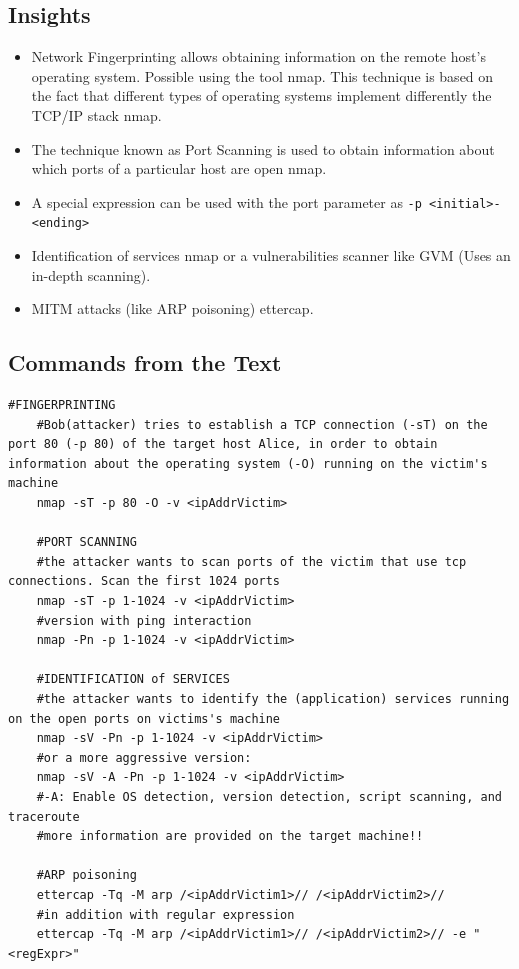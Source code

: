 \subsection*{Insights}
\begin{itemize}
	\item Network Fingerprinting allows obtaining information on the remote host’s operating system. Possible using the tool nmap. This technique is based on the fact that different types of operating systems implement differently the TCP/IP stack \textrightarrow nmap.
	\item The technique known as Port Scanning is used to obtain information about which ports of a particular host are open \textrightarrow nmap.
    \item A special expression can be used with the port parameter as \texttt{-p <initial>-<ending>}
    \item Identification of services \textrightarrow nmap or a vulnerabilities scanner like GVM (Uses an in-depth scanning).
    \item MITM attacks (like ARP poisoning) \textrightarrow ettercap.
\end{itemize}

\subsection*{Commands from the Text}

\begin{lstlisting}[style=bashStyle]
    #FINGERPRINTING
    #Bob(attacker) tries to establish a TCP connection (-sT) on the port 80 (-p 80) of the target host Alice, in order to obtain information about the operating system (-O) running on the victim's machine
    nmap -sT -p 80 -O -v <ipAddrVictim>

    #PORT SCANNING
    #the attacker wants to scan ports of the victim that use tcp connections. Scan the first 1024 ports
    nmap -sT -p 1-1024 -v <ipAddrVictim>
    #version with ping interaction
    nmap -Pn -p 1-1024 -v <ipAddrVictim>

    #IDENTIFICATION of SERVICES
    #the attacker wants to identify the (application) services running on the open ports on victims's machine
    nmap -sV -Pn -p 1-1024 -v <ipAddrVictim>
    #or a more aggressive version:
    nmap -sV -A -Pn -p 1-1024 -v <ipAddrVictim>
    #-A: Enable OS detection, version detection, script scanning, and traceroute
    #more information are provided on the target machine!!

    #ARP poisoning
    ettercap -Tq -M arp /<ipAddrVictim1>// /<ipAddrVictim2>//
    #in addition with regular expression
    ettercap -Tq -M arp /<ipAddrVictim1>// /<ipAddrVictim2>// -e "<regExpr>"

\end{lstlisting}

